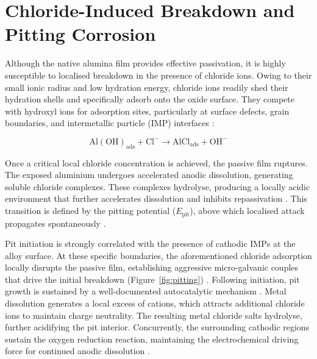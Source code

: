 \documentclass[11pt,twoside,a4paper,final]{report}
\begin{document}
\section{Chloride-Induced Breakdown and Pitting Corrosion}
\label{sec:chloride_pitting}

Although the native alumina film provides effective passivation, it is highly susceptible to localised breakdown in the presence of chloride ions. Owing to their small ionic radius and low hydration energy, chloride ions readily shed their hydration shells and specifically adsorb onto the oxide surface. They compete with hydroxyl ions for adsorption sites, particularly at surface defects, grain boundaries, and intermetallic particle (IMP) interfaces \cite{Vargel2020, Zhang2018, McCafferty2010}:

\begin{equation}
    \mathrm{Al(OH)_{ads}} + \mathrm{Cl^{-}} \rightarrow \mathrm{AlCl_{ads}} + \mathrm{OH^{-}}
    \label{eq:cl_adsorption}
\end{equation}

Once a critical local chloride concentration is achieved, the passive film ruptures. The exposed aluminium undergoes accelerated anodic dissolution, generating soluble chloride complexes. These complexes hydrolyse, producing a locally acidic environment that further accelerates dissolution and inhibits repassivation \cite{Vargel2020, Ghali2010}. This transition is defined by the pitting potential ($E_{\text{pit}}$), above which localised attack propagates spontaneously \cite{Revie2008, Ghali2010}.

Pit initiation is strongly correlated with the presence of cathodic IMPs at the alloy surface. At these specific boundaries, the aforementioned chloride adsorption locally disrupts the passive film, establishing aggressive micro-galvanic couples that drive the initial breakdown (Figure~\ref{fig:pitting}) \cite{Vargel2020, Zhang2018, Ghali2010, McCafferty2010}. Following initiation, pit growth is sustained by a well-documented autocatalytic mechanism \cite{Sastri2007, Ghali2010}. Metal dissolution generates a local excess of cations, which attracts additional chloride ions to maintain charge neutrality. The resulting metal chloride salts hydrolyse, further acidifying the pit interior. Concurrently, the surrounding cathodic regions sustain the oxygen reduction reaction, maintaining the electrochemical driving force for continued anodic dissolution \cite{Revie2008, Sastri2007, Ghali2010, Vargel2020}. 
\end{document}
